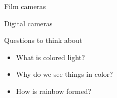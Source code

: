 \begin{frame}{Film cameras}
\end{frame}

\begin{frame}{Digital cameras}
\end{frame}

\begin{frame}{Questions to think about}
  \begin{itemize}
    \item What is colored light?
    \item Why do we see things in color?
    \item How is rainbow formed?
  \end{itemize}
\end{frame}

